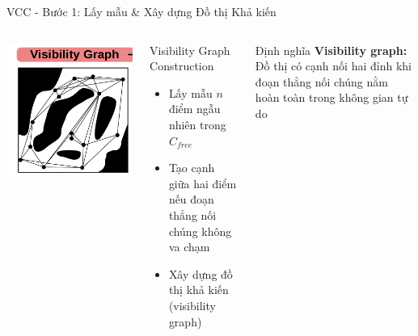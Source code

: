 \documentclass[aspectratio=169]{beamer}
\begin{document}
\begin{frame}{VCC - Bước 1: Lấy mẫu \& Xây dựng Đồ thị Khả kiến}
    \begin{columns}[c]
        \centering
        \includegraphics[width=\textwidth]{imgs/VCC-1.png}

        \begin{block}{Visibility Graph Construction}
            \small
            \begin{itemize}
                \item Lấy mẫu $n$ điểm ngẫu nhiên trong $C_{free}$
                \item Tạo cạnh giữa hai điểm nếu đoạn thẳng nối chúng không va chạm
                \item Xây dựng đồ thị khả kiến (visibility graph)
            \end{itemize}
        \end{block}

        \begin{exampleblock}{Định nghĩa}
            \small
            \textbf{Visibility graph:} Đồ thị có cạnh nối hai đỉnh khi đoạn thẳng nối chúng nằm hoàn toàn trong không gian tự do
        \end{exampleblock}
    \end{columns}
\end{frame}
\end{document}
